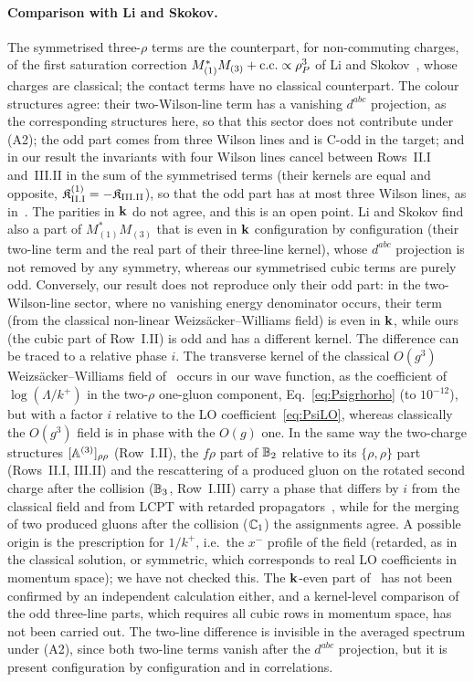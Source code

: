 \paragraph{Comparison with Li and Skokov.} The symmetrised three-$\rho$ terms are the counterpart, for non-commuting charges, of the first saturation correction $M_{(1)}^*M_{(3)}+{\rm c.c.}\propto\rho_P^3$ of Li and Skokov~\cite{Li:2021ntm}, whose charges are classical; the contact terms have no classical counterpart. The colour structures agree: their two-Wilson-line term has a vanishing $d^{abc}$ projection, as the corresponding structures here, so that this sector does not contribute under (A2); the odd part comes from three Wilson lines and is C-odd in the target; and in our result the invariants with four Wilson lines cancel between Rows~II.I and~III.II in the sum of the symmetrised terms (their kernels are equal and opposite, $\mathfrak K^{(1)}_{\rm II.I}=-\mathfrak K_{\rm III.II}$), so that the odd part has at most three Wilson lines, as in~\cite{McLerran:2016snu,Li:2021ntm}. The parities in $\mathbf{k}$ do not agree, and this is an open point. Li and Skokov find also a part of $M_{(1)}^*M_{(3)}$ that is even in $\mathbf{k}$ configuration by configuration (their two-line term and the real part of their three-line kernel), whose $d^{abc}$ projection is not removed by any symmetry, whereas our symmetrised cubic terms are purely odd. Conversely, our result does not reproduce only their odd part: in the two-Wilson-line sector, where no vanishing energy denominator occurs, their term (from the classical non-linear Weizs\"acker--Williams field) is even in $\mathbf{k}$, while ours (the cubic part of Row~I.II) is odd and has a different kernel. The difference can be traced to a relative phase $i$. The transverse kernel of the classical $O(g^3)$ Weizs\"acker--Williams field of~\cite{Li:2021ntm} occurs in our wave function, as the coefficient of $\log(\Lambda/k^+)$ in the two-$\rho$ one-gluon component, Eq.~\eqref{eq:Psigrhorho} (to $10^{-12}$), but with a factor $i$ relative to the LO coefficient~\eqref{eq:PsiLO}, whereas classically the $O(g^3)$ field is in phase with the $O(g)$ one. In the same way the two-charge structures $[\mathbb{A}^{(3)}]_{\rho\rho}$ (Row~I.II), the $f\rho$ part of $\mathbb{B}_2$ relative to its $\{\rho,\rho\}$ part (Rows~II.I, III.II) and the rescattering of a produced gluon on the rotated second charge after the collision ($\mathbb{B}_3$, Row~I.III) carry a phase that differs by $i$ from the classical field and from LCPT with retarded propagators~\cite{Kovchegov:2018jun}, while for the merging of two produced gluons after the collision ($\mathbb{C}_1$) the assignments agree. A possible origin is the prescription for $1/k^+$, i.e.\ the $x^-$ profile of the field (retarded, as in the classical solution, or symmetric, which corresponds to real LO coefficients in momentum space); we have not checked this. The $\mathbf{k}$-even part of~\cite{Li:2021ntm} has not been confirmed by an independent calculation either, and a kernel-level comparison of the odd three-line parts, which requires all cubic rows in momentum space, has not been carried out. The two-line difference is invisible in the averaged spectrum under (A2), since both two-line terms vanish after the $d^{abc}$ projection, but it is present configuration by configuration and in correlations.

